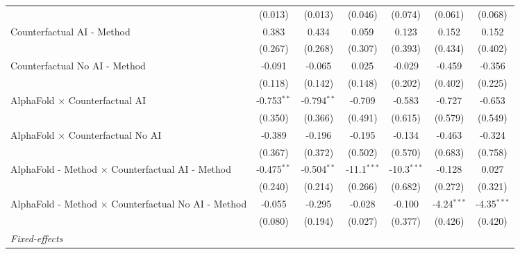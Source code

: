\begin{tabular}{lcccccc}
                                                              & (0.013)       & (0.013)        & (0.046)       & (0.074)       & (0.061)       & (0.068)\\   
   Counterfactual AI - Method                                 & 0.383         & 0.434          & 0.059         & 0.123         & 0.152         & 0.152\\   
                                                              & (0.267)       & (0.268)        & (0.307)       & (0.393)       & (0.434)       & (0.402)\\   
   Counterfactual No AI - Method                              & -0.091        & -0.065         & 0.025         & -0.029        & -0.459        & -0.356\\   
                                                              & (0.118)       & (0.142)        & (0.148)       & (0.202)       & (0.402)       & (0.225)\\   
   AlphaFold $\times$ Counterfactual AI                       & -0.753$^{**}$ & -0.794$^{**}$  & -0.709        & -0.583        & -0.727        & -0.653\\   
                                                              & (0.350)       & (0.366)        & (0.491)       & (0.615)       & (0.579)       & (0.549)\\   
   AlphaFold $\times$ Counterfactual No AI                    & -0.389        & -0.196         & -0.195        & -0.134        & -0.463        & -0.324\\   
                                                              & (0.367)       & (0.372)        & (0.502)       & (0.570)       & (0.683)       & (0.758)\\   
   AlphaFold - Method $\times$ Counterfactual AI - Method     & -0.475$^{**}$ & -0.504$^{**}$  & -11.1$^{***}$ & -10.3$^{***}$ & -0.128        & 0.027\\   
                                                              & (0.240)       & (0.214)        & (0.266)       & (0.682)       & (0.272)       & (0.321)\\   
   AlphaFold - Method $\times$ Counterfactual No AI - Method  & -0.055        & -0.295         & -0.028        & -0.100        & -4.24$^{***}$ & -4.35$^{***}$\\   
                                                              & (0.080)       & (0.194)        & (0.027)       & (0.377)       & (0.426)       & (0.420)\\   
   \midrule
   \emph{Fixed-effects}\\

\end{tabular}
